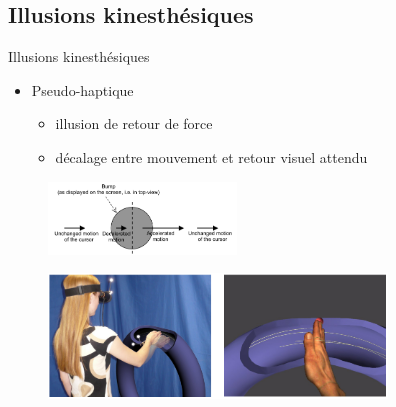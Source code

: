 \documentclass[compress, noflama]{beamer}
\begin{document}
\subsection{Illusions kinesthésiques}
\begin{frame}{Illusions kinesthésiques}
\begin{multicols}{2}
\begin{itemize}
\item Pseudo-haptique
\begin{itemize}
\item illusion de retour de force
\item décalage entre mouvement et retour visuel attendu
\end{itemize}
\end{itemize}
\begin{figure}
\centering
\includegraphics[width=5cm]{images/pseudoHaptic}
\caption{\cite{Lecuyer2009}}
\end{figure}
\end{multicols}
\begin{figure}
\centering
\includegraphics[width=9cm]{images/pseudoHaptic3D}
\caption{\cite{Pusch2008}}
\end{figure}
\end{frame}
\end{document}
